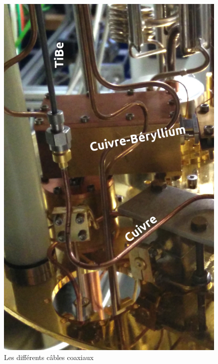 \documentclass[10pt,a9paper,handout]{beamer} \usepackage[utf8]{inputenc} \usepackage[francais]{babel} \usepackage[T1]{fontenc}
\begin{document}
\begin{frame}
\begin{columns}
\begin{column}{0.3\textwidth}
\begin{figure}[h]
\begin{center}
        \includegraphics[width=\textwidth]{Images/Coax}
        \caption{Les différents câbles coaxiaux}
    \end{center}
\end{figure}
\end{column}
\end{columns}
\end{frame}
\end{document}
